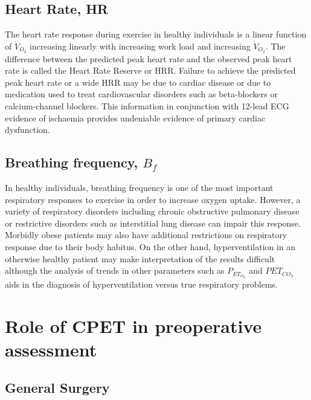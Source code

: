 \subsection[Heart Rate]{Heart Rate, HR}
\label{sec:heart_rate}
The heart rate response during exercise in healthy individuals is a linear function of $\dot{V}_{O_2}$ increasing linearly with increasing work load and increasing $\dot{V}_{O_2}$. 
The difference between the predicted peak heart rate and the observed peak heart rate is called the Heart Rate Reserve or HRR. 
Failure to achieve the predicted peak heart rate or a wide HRR may be due to cardiac disease or due to medication used to treat cardiovascular disorders such as beta-blockers or calcium-channel blockers. 
This information in conjunction with 12-lead ECG evidence of ischaemia provides undeniable evidence of primary cardiac dysfunction.

\subsection[Breathing frequency]{Breathing frequency, $B_f$}
In healthy individuals, breathing frequency is one of the most important respiratory responses to exercise in order to increase oxygen uptake. 
However, a variety of respiratory disorders including chronic obstructive pulmonary disease or restrictive disorders such as interstitial lung disease can impair this response. 
Morbidly obese patients may also have additional restrictions on respiratory response due to their body habitus. 
On the other hand, hyperventilation in an otherwise healthy patient may make interpretation of the results difficult although the analysis of trends in other parameters such as $P_{ET_{O_2}}$ and $P{ET_{CO_2}}$ aids in the diagnosis of hyperventilation versus true respiratory problems.

\section{Role of CPET in preoperative assessment}
\label{sec:cpx_roleInAssessment}
\subsection{General Surgery}

